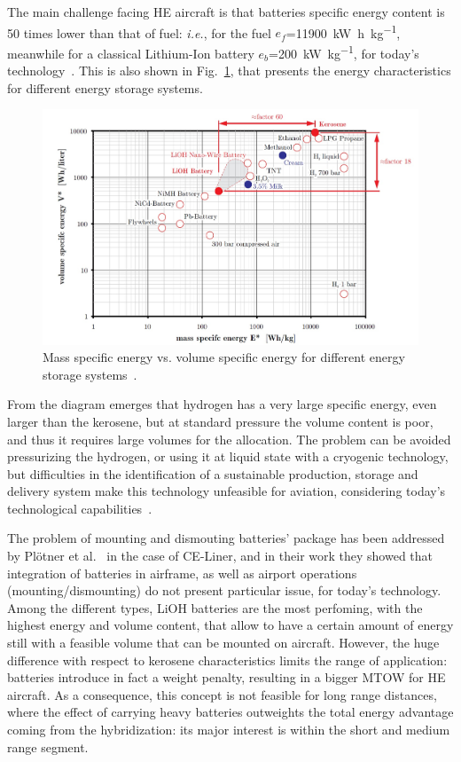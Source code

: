 The main challenge facing HE aircraft is that batteries specific energy content is 50 times lower than that of fuel: \textit{i.e.}, for the fuel $e_f$=11900~\si{\kilo\watt\hour\per\kilogram}, meanwhile for a classical Lithium-Ion battery $e_b$=200~\si{\kilo\watt\per\kilogram}, for today's technology~\cite{bib:rheaume}.
This is also shown in Fig.~\ref{fig:energy_storage_properties}, that presents the energy characteristics for different energy storage systems. 
\begin{figure}[!h]
	\centering
	\includegraphics[width=0.8\linewidth, keepaspectratio]{images/chap1/energy_storage_properties.jpg}
	\caption{Mass specific energy vs. volume specific energy for different energy storage systems~\cite{bib:hepperle}.}
	\label{fig:energy_storage_properties}
\end{figure}

From the diagram emerges that hydrogen has a very large specific energy, even larger than the kerosene, but at standard pressure the volume content is poor, and thus it requires large volumes for the allocation. 
The problem can be avoided pressurizing the hydrogen, or using it at liquid state with a cryogenic technology, but difficulties in the identification of a sustainable production, storage and delivery system make this technology unfeasible for aviation, considering today's technological capabilities~\cite{bib:rondinelli}.

The problem of mounting and dismouting batteries' package has been addressed by Pl\"{o}tner et al.~\cite{bib:plotner} in the case of CE-Liner, and in their work they showed that integration of batteries in airframe, as well as airport operations (mounting/dismounting) do not present particular issue, for today's technology. 
Among the different types, LiOH batteries are the most perfoming, with the highest energy and volume content, that allow to have a certain amount of energy still with a feasible volume that can be mounted on aircraft.  
However, the huge difference with respect to kerosene characteristics limits the range of application: batteries introduce in fact a weight penalty, resulting in a bigger MTOW for HE aircraft. 
As a consequence, this concept is not feasible for long range distances, where the effect of carrying heavy batteries outweights the total energy advantage coming from the hybridization: its major interest is within the short and medium range segment.  

